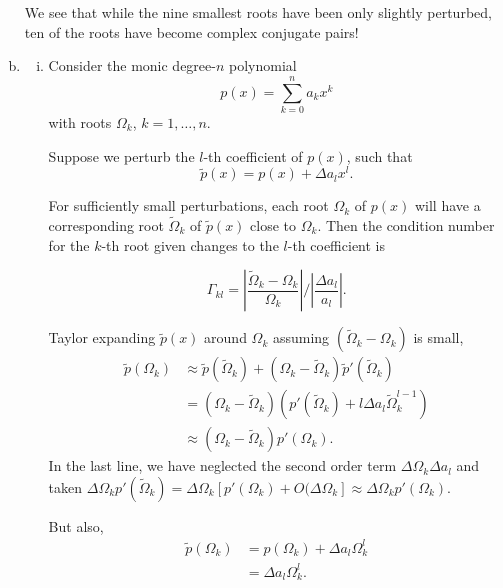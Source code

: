 \documentclass[12pt]{article}
\begin{document}
\begin{enumerate}[(a)]
We see that while the nine smallest roots have been only slightly perturbed, ten of the roots have become complex conjugate pairs!


\item 

	\begin{enumerate}[(i)]
	\item

	Consider the monic degree-$n$ polynomial
	\begin{equation*}
	p(x) = \sum_{k=0}^n a_k x^k
	\end{equation*}
	with roots $\Omega_k$, $k = 1,\dots, n$.

	Suppose we perturb the $l$-th coefficient of $p(x)$, such that
	\begin{equation*}
	\widetilde{p}(x) = p(x) + \Delta a_l x^{l}.
	\end{equation*}

	For sufficiently small perturbations, each root $\Omega_k$ of $p(x)$ will have a corresponding root $\widetilde{\Omega}_k$ of $\widetilde{p}(x)$ close to $\Omega_k$. Then the condition number for the $k$-th root given changes to the $l$-th coefficient is

	\begin{equation*}
	\Gamma_{kl} = \left|\frac{\widetilde{\Omega}_k - \Omega_k}{\Omega_k}\right| / \left|\frac{\Delta a_l}{a_l}\right|.
	\end{equation*}

	Taylor expanding $\widetilde{p}(x)$ around $\Omega_k$ assuming $(\widetilde{\Omega}_k - \Omega_k)$ is small, 
	\begin{equation*}
	\begin{aligned}
	\widetilde{p}(\Omega_k) &\approx \widetilde{p}(\widetilde{\Omega}_k) + (\Omega_k - \widetilde{\Omega}_k)\widetilde{p}'(\widetilde{\Omega}_k) \\
	&= (\Omega_k - \widetilde{\Omega}_k)\left(p'(\widetilde{\Omega}_k)+ l\Delta a_l\widetilde{\Omega}_k ^{l-1}\right) \\
	&\approx (\Omega_k - \widetilde{\Omega}_k)p'(\Omega_k).
	\end{aligned}
	\end{equation*}
	In the last line, we have neglected the second order term $\Delta\Omega_k\Delta a_l$ and taken $\Delta\Omega_k p'(\widetilde{\Omega}_k) = \Delta\Omega_k [p'(\Omega_k) + O(\Delta\Omega_k] \approx \Delta \Omega_k p'(\Omega_k)$.

	But also,
	\begin{equation*}
	\begin{aligned}
	\widetilde{p}(\Omega_k) &= p(\Omega_k) + \Delta a_l \Omega_k^l \\
	&= \Delta a_l \Omega_k^l.
	\end{aligned}
	\end{equation*}


\end{enumerate}
\end{enumerate}
\end{document}
